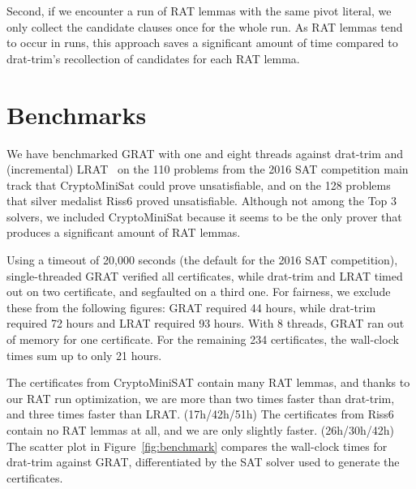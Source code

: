 \documentclass{llncs}
\begin{document}
Second, if we encounter a run of RAT lemmas with the same pivot literal, we only collect the candidate clauses once for the whole run.
As RAT lemmas tend to occur in runs, this approach saves a significant amount of time compared to drat-trim's recollection of candidates for each RAT lemma.

% 

\section{Benchmarks}
  We have benchmarked GRAT with one and eight threads against drat-trim and (incremental) LRAT~\cite{HHKW17} on the 110 problems from the 2016 SAT competition main track that CryptoMiniSat could prove unsatisfiable,
  and on the 128 problems that silver medalist Riss6 proved unsatisfiable.
  Although not among the Top 3 solvers, we included CryptoMiniSat because it seems to be the only prover that produces a significant amount of RAT lemmas.
  
  Using a timeout of 20,000 seconds (the default for the 2016 SAT competition), single-threaded GRAT verified all certificates, while drat-trim and LRAT timed out
  on two certificate, and segfaulted on a third one. For fairness, we exclude these from the following figures:
  GRAT required 44 hours, while drat-trim required 72 hours and LRAT required 93 hours.
  With 8 threads, GRAT ran out of memory for one certificate. For the remaining 234 certificates, the wall-clock times sum up to only 21 hours.
  
  The certificates from CryptoMiniSAT contain many RAT lemmas, and thanks to our RAT run optimization, we are more than two times faster than drat-trim, and 
  three times faster than LRAT. (17h/42h/51h)
  The certificates from Riss6 contain no RAT lemmas at all, and we are only slightly faster. (26h/30h/42h)
  The scatter plot in Figure~\ref{fig:benchmark} compares the wall-clock times for drat-trim against GRAT, differentiated by the SAT solver used to generate the certificates.
  
\end{document}
